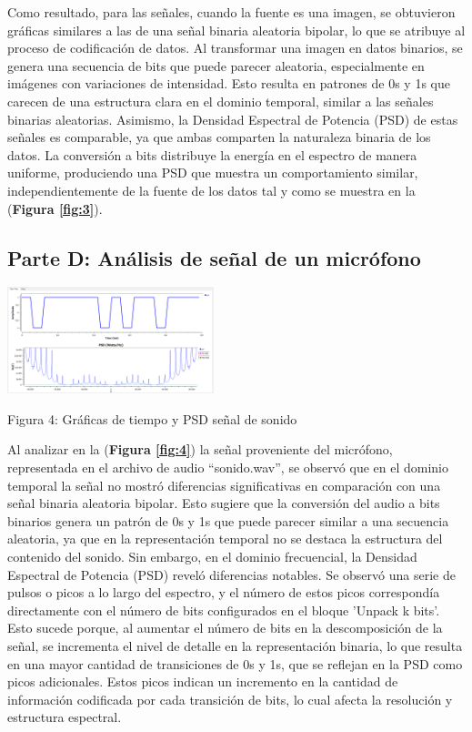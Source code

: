 \documentclass{journal}[IEEEtran, twocolumn]             %
\begin{document}
\begin{multicols}{2}
Como resultado, para las señales, cuando la fuente es una imagen, se obtuvieron gráficas similares a las de una señal binaria aleatoria bipolar, lo que se atribuye al proceso de codificación de datos. Al transformar una imagen en datos binarios, se genera una secuencia de bits que puede parecer aleatoria, especialmente en imágenes con variaciones de intensidad. Esto resulta en patrones de 0s y 1s que carecen de una estructura clara en el dominio temporal, similar a las señales binarias aleatorias. Asimismo, la Densidad Espectral de Potencia (PSD) de estas señales es comparable, ya que ambas comparten la naturaleza binaria de los datos. La conversión a bits distribuye la energía en el espectro de manera uniforme, produciendo una PSD que muestra un comportamiento similar, independientemente de la fuente de los datos tal y como se muestra en la (\textbf{Figura \ref{fig:3}}).


\subsection{Parte D: Análisis de señal de un micrófono}


    \begin{center}
    \includegraphics[width=0.45\textwidth]{figs/F5.png}
    \caption{Figura 4: Gráficas de tiempo y PSD señal de sonido}
    \label{fig:4}
    \end{center}
    
Al analizar en la (\textbf{Figura \ref{fig:4}}) la señal proveniente del micrófono, representada en el archivo de audio ``sonido.wav'', se observó que en el dominio temporal la señal no mostró diferencias significativas en comparación con una señal binaria aleatoria bipolar. Esto sugiere que la conversión del audio a bits binarios genera un patrón de 0s y 1s que puede parecer similar a una secuencia aleatoria, ya que en la representación temporal no se destaca la estructura del contenido del sonido. Sin embargo, en el dominio frecuencial, la Densidad Espectral de Potencia (PSD) reveló diferencias notables. Se observó una serie de pulsos o picos a lo largo del espectro, y el número de estos picos correspondía directamente con el número de bits configurados en el bloque 'Unpack k bits'. Esto sucede porque, al aumentar el número de bits en la descomposición de la señal, se incrementa el nivel de detalle en la representación binaria, lo que resulta en una mayor cantidad de transiciones de 0s y 1s, que se reflejan en la PSD como picos adicionales. Estos picos indican un incremento en la cantidad de información codificada por cada transición de bits, lo cual afecta la resolución y estructura espectral.


\end{multicols}
\end{document}
